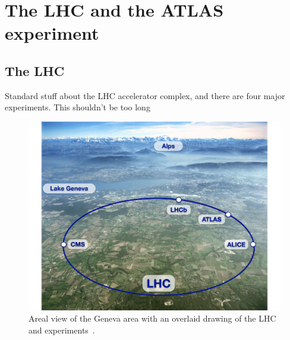 \chapter[The LHC and the ATLAS experiment][The LHC and ATLAS]
        {The LHC and the ATLAS experiment}
\label{ch:lhc}

\FloatBarrier
\section{The LHC}
\label{sec:lhc}

{\color{red}Standard stuff about the LHC accelerator complex, and there
  are four major experiments. This shouldn't be too long}

\begin{figure}[ht]
  \centering
  \includegraphics[width=\textwidth, clip=true, trim=0 0 1cm 0]
    {figs/lhc/lhc_aerial.pdf}
  \caption{
    Areal view of the Geneva area with an overlaid drawing of the LHC
    and experiments~\cite{lhc_aerial}.
  }
  \label{fig:lhc_aerial}
\end{figure}

